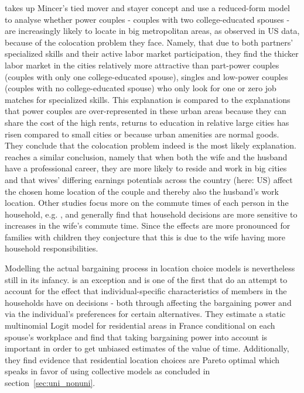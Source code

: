 \cite{CostaKhan2000} takes up Mincer's tied mover and stayer concept and use a reduced-form model to analyse whether power couples - couples with two college-educated spouses - are increasingly likely to locate in big metropolitan areas, as observed in US data, because of the colocation problem they face. Namely, that due to both partners' specialized skills and their active labor market participation, they find the thicker labor market in the cities relatively more attractive than part-power couples (couples with only one college-educated spouse), singles and low-power couples (couples with no college-educated spouse) who only look for one or zero job matches for specialized skills. This explanation is compared to the explanations that power couples are over-represented in these urban areas because they can share the cost of the high rents, returns to education in relative large cities has risen compared to small cities or because urban amenities are normal goods. They conclude that the colocation problem indeed is the most likely explanation. \cite{FreedmanKern1997} reaches a similar conclusion, namely that when both the wife and the husband have a professional career, they are more likely to reside and work in big cities and that wives' differing earnings potentials across the country (here: US) affect the chosen home location of the couple and thereby also the husband's work location. Other studies focus more on the commute times of each person in the household, e.g. \cite{SermonsKoppelman2001}, and generally find that household decisions are more sensitive to increases in the wife's commute time. Since the effects are more pronounced for families with children they conjecture that this is due to the wife having more household responsibilities. 

Modelling the actual bargaining process in location choice models is nevertheless still in its infancy. \cite{Chiapporietal2014} is an exception and is one of the first that do an attempt to account for the effect that individual-specific characteristics of members in the households have on decisions - both through affecting the bargaining power and via the individual's preferences for certain alternatives. They estimate a static multinomial Logit model for residential areas in France conditional on each spouse's workplace and find that taking bargaining power into account is important in order to get unbiased estimates of the value of time. Additionally, they find evidence that residential location choices are Pareto optimal which speaks in favor of using collective models as concluded in section~\ref{sec:uni_nonuni}.

